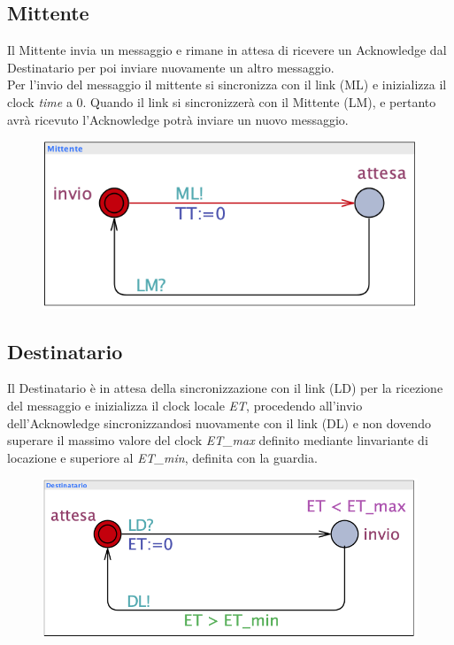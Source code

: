 \documentclass{article}
\begin{document}
\subsection{Mittente}
Il Mittente invia un messaggio e rimane in attesa di ricevere un Acknowledge dal Destinatario per poi inviare nuovamente un altro messaggio. 
\\Per l'invio del messaggio il mittente si sincronizza con il link (ML) e inizializza il clock \textit{time} a 0. Quando il link si sincronizzerà con il Mittente (LM), e pertanto avrà ricevuto l'Acknowledge potrà inviare un nuovo messaggio.
\begin{figure}[h] 
\centering
\includegraphics[scale=0.5]{modelloAM.png}
\end{figure}
\subsection{Destinatario}
Il Destinatario è in attesa della sincronizzazione con il link (LD) per la ricezione del messaggio e inizializza il clock locale \textit{ET}, procedendo all'invio dell'Acknowledge sincronizzandosi nuovamente con il link (DL) e non dovendo superare il massimo valore del clock \textit{ET\_max} definito mediante linvariante di locazione e superiore al \textit{ET\_min}, definita con la guardia.
\begin{figure}[h] 
\centering
\includegraphics[scale=0.4]{modelloAD.png}
\end{figure}
\end{document}
